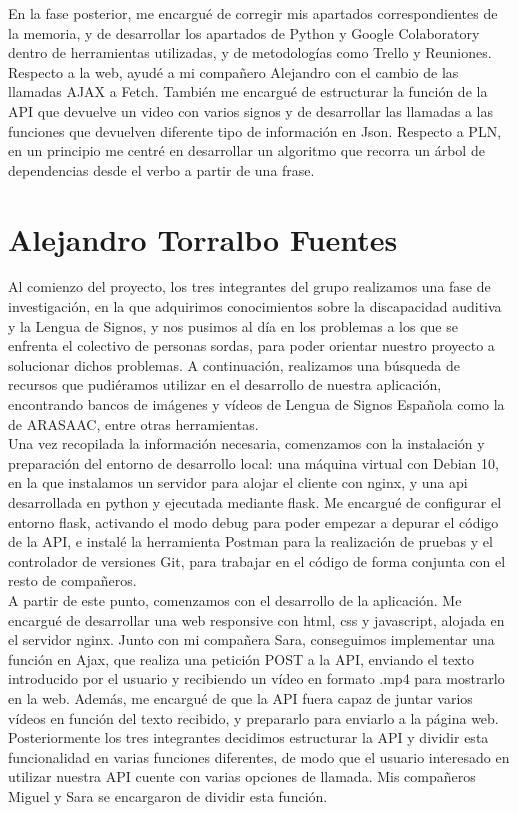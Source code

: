 En la fase posterior, me encargué de corregir mis apartados correspondientes de la memoria, y de desarrollar los apartados de Python y Google Colaboratory dentro de herramientas utilizadas, y de metodologías como Trello y Reuniones. Respecto a la web, ayudé a mi compañero Alejandro con el cambio de las llamadas AJAX a Fetch. También me encargué de estructurar la función de la API que devuelve un video con varios signos y de desarrollar las llamadas a las funciones que devuelven diferente tipo de información en Json. Respecto a PLN, en un principio me centré en desarrollar un algoritmo que recorra un árbol de dependencias desde el verbo a partir de una frase.\\


\section{Alejandro Torralbo Fuentes}


Al comienzo del proyecto, los tres integrantes del grupo realizamos una fase de investigación, en la que adquirimos conocimientos sobre la discapacidad auditiva y la Lengua de Signos, y nos pusimos al día en los problemas a los que se enfrenta el colectivo de personas sordas, para poder orientar nuestro proyecto a solucionar dichos problemas. A continuación, realizamos una búsqueda de recursos que pudiéramos utilizar en el desarrollo de nuestra aplicación, encontrando bancos de imágenes y vídeos de Lengua de Signos Española como la de ARASAAC, entre otras herramientas.\\

Una vez recopilada la información necesaria, comenzamos con la instalación y preparación del entorno de desarrollo local: una máquina virtual con Debian 10, en la que instalamos un servidor para alojar el cliente con nginx, y una api desarrollada en python y ejecutada mediante flask. Me encargué de configurar el entorno flask, activando el modo debug para poder empezar a depurar el código de la API, e instalé la herramienta Postman para la realización de pruebas y el controlador de versiones Git, para trabajar en el código de forma conjunta con el resto de compañeros.\\

A partir de este punto, comenzamos con el desarrollo de la aplicación. Me encargué de desarrollar una web responsive con html, css y javascript, alojada en el servidor nginx. Junto con mi compañera Sara, conseguimos implementar una función en  Ajax, que realiza una petición POST a la API, enviando el texto introducido por el usuario y recibiendo un vídeo en formato .mp4 para mostrarlo en la web. Además, me encargué de que la API fuera capaz de juntar varios vídeos en función del texto recibido, y prepararlo para enviarlo a la página web. Posteriormente los tres integrantes decidimos estructurar la API y dividir esta funcionalidad en varias funciones diferentes, de modo que el usuario interesado en utilizar nuestra API cuente con varias opciones de llamada. Mis compañeros Miguel y Sara se encargaron de dividir esta función.\\


